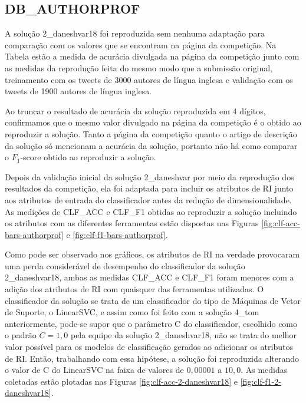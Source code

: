 		\subsection{DB\_AUTHORPROF}
			A solução 2\_daneshvar18 foi reproduzida sem nenhuma adaptação para comparação com os valores que se encontram na página da competição.
			Na Tabela estão a medida de acurácia divulgada na página da competição \cite{PAN_APCLEF_2018} junto com as medidas da reprodução feita do mesmo modo que a submissão original, treinamento com os tweets de 3000 autores de língua inglesa e validação com os tweets de 1900 autores de língua inglesa.

			

			Ao truncar o resultado de acurácia da solução reproduzida em 4 dígitos, confirmamos que o mesmo valor divulgado na página da competição é o obtido ao reproduzir a solução.
			Tanto a página da competição quanto o artigo de descrição da solução \cite{daneshvar:2018} só mencionam a acurácia da solução, portanto não há como comparar o $F_1$-score obtido ao reproduzir a solução.

			Depois da validação inicial da solução 2\_daneshvar por meio da reprodução dos resultados da competição, ela foi adaptada para incluir os atributos de RI junto aos atributos de entrada do classificador antes da redução de dimensionalidade.
			As medições de CLF\_ACC e CLF\_F1 obtidas ao reproduzir a solução incluindo os atributos com as diferentes ferramentas estão dispostas nas Figuras \ref{fig:clf-acc-bars-authorprof} e \ref{fig:clf-f1-bars-authorprof}.


			


			

			Como pode ser observado nos gráficos, os atributos de RI na verdade provocaram uma perda considerável de desempenho do classificador da solução 2\_daneshvar18, ambas as medidas CLF\_ACC e CLF\_F1 foram menores com a adição dos atributos de RI com quaisquer das ferramentas utilizadas.
			O classificador da solução se trata de um classificador do tipo de Máquinas de Vetor de Suporte, o LinearSVC, e assim como foi feito com a solução 4\_tom anteriormente, pode-se supor que o parâmetro C do classificador, escolhido como o padrão $C = 1,0$ pela equipe da solução 2\_daneshvar18, não se trata do melhor valor possível para os modelos de classificação gerados ao adicionar os atributos de RI.
			Então, trabalhando com essa hipótese, a solução foi reproduzida alterando o valor de C do LinearSVC na faixa de valores de $0,00001$ a $10,0$.
			As medidas coletadas estão plotadas nas Figuras \ref{fig:clf-acc-2-daneshvar18} e \ref{fig:clf-f1-2-daneshvar18}.


